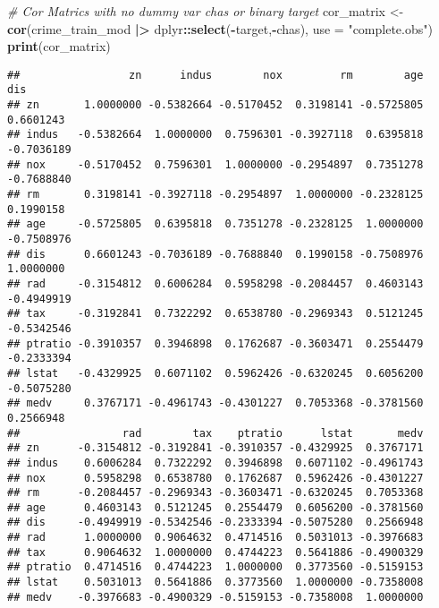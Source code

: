 \documentclass[
]{article}
\newenvironment{Shaded}{\begin{snugshade}}{\end{snugshade}}
\newcommand{\AttributeTok}[1]{\textcolor[rgb]{0.13,0.29,0.53}{#1}}
\newcommand{\CommentTok}[1]{\textcolor[rgb]{0.56,0.35,0.01}{\textit{#1}}}
\newcommand{\FunctionTok}[1]{\textcolor[rgb]{0.13,0.29,0.53}{\textbf{#1}}}
\newcommand{\NormalTok}[1]{#1}
\newcommand{\OtherTok}[1]{\textcolor[rgb]{0.56,0.35,0.01}{#1}}
\newcommand{\SpecialCharTok}[1]{\textcolor[rgb]{0.81,0.36,0.00}{\textbf{#1}}}
\newcommand{\StringTok}[1]{\textcolor[rgb]{0.31,0.60,0.02}{#1}}
\begin{document}
\begin{Shaded}
\begin{Highlighting}[]
\CommentTok{\# Cor Matrics with no dummy var chas or binary target }
\NormalTok{cor\_matrix }\OtherTok{\textless{}{-}} \FunctionTok{cor}\NormalTok{(crime\_train\_mod }\SpecialCharTok{|\textgreater{}}\NormalTok{ dplyr}\SpecialCharTok{::}\FunctionTok{select}\NormalTok{(}\SpecialCharTok{{-}}\NormalTok{target,}\SpecialCharTok{{-}}\NormalTok{chas), }\AttributeTok{use =} \StringTok{"complete.obs"}\NormalTok{)}
\FunctionTok{print}\NormalTok{(cor\_matrix)}
\end{Highlighting}
\end{Shaded}

\begin{verbatim}
##                 zn      indus        nox         rm        age        dis
## zn       1.0000000 -0.5382664 -0.5170452  0.3198141 -0.5725805  0.6601243
## indus   -0.5382664  1.0000000  0.7596301 -0.3927118  0.6395818 -0.7036189
## nox     -0.5170452  0.7596301  1.0000000 -0.2954897  0.7351278 -0.7688840
## rm       0.3198141 -0.3927118 -0.2954897  1.0000000 -0.2328125  0.1990158
## age     -0.5725805  0.6395818  0.7351278 -0.2328125  1.0000000 -0.7508976
## dis      0.6601243 -0.7036189 -0.7688840  0.1990158 -0.7508976  1.0000000
## rad     -0.3154812  0.6006284  0.5958298 -0.2084457  0.4603143 -0.4949919
## tax     -0.3192841  0.7322292  0.6538780 -0.2969343  0.5121245 -0.5342546
## ptratio -0.3910357  0.3946898  0.1762687 -0.3603471  0.2554479 -0.2333394
## lstat   -0.4329925  0.6071102  0.5962426 -0.6320245  0.6056200 -0.5075280
## medv     0.3767171 -0.4961743 -0.4301227  0.7053368 -0.3781560  0.2566948
##                rad        tax    ptratio      lstat       medv
## zn      -0.3154812 -0.3192841 -0.3910357 -0.4329925  0.3767171
## indus    0.6006284  0.7322292  0.3946898  0.6071102 -0.4961743
## nox      0.5958298  0.6538780  0.1762687  0.5962426 -0.4301227
## rm      -0.2084457 -0.2969343 -0.3603471 -0.6320245  0.7053368
## age      0.4603143  0.5121245  0.2554479  0.6056200 -0.3781560
## dis     -0.4949919 -0.5342546 -0.2333394 -0.5075280  0.2566948
## rad      1.0000000  0.9064632  0.4714516  0.5031013 -0.3976683
## tax      0.9064632  1.0000000  0.4744223  0.5641886 -0.4900329
## ptratio  0.4714516  0.4744223  1.0000000  0.3773560 -0.5159153
## lstat    0.5031013  0.5641886  0.3773560  1.0000000 -0.7358008
## medv    -0.3976683 -0.4900329 -0.5159153 -0.7358008  1.0000000
\end{verbatim}
\end{document}
